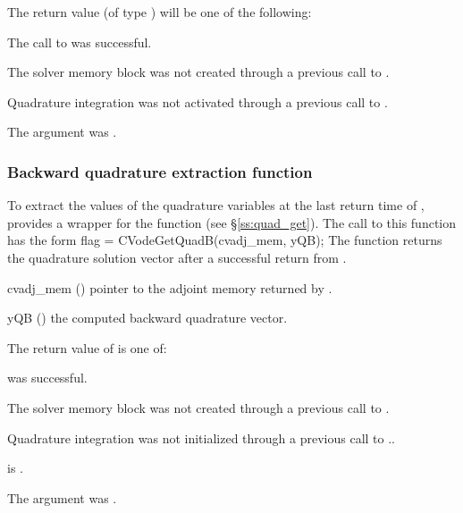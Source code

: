 {
  The return value  (of type ) will be one of the following:
  \begin{args}
  \item[\Id{CV\_SUCCESS}]
    The call to  was successful.
  \item[\Id{CV\_MEM\_NULL}] 
    The {\cvodes} solver memory block was not created through a 
    previous call to .
  \item[\Id{CV\_NO\_QUAD}] 
    Quadrature integration was not activated through a 
    previous call to .
  \item[\Id{CV\_ADJMEM\_NULL}]
    The  argument was .
  \end{args}
}
{}

\subsubsection{Backward quadrature extraction function}

To extract the values of the quadrature variables at the last return time
of , {\cvodes} provides a wrapper for the function 
(see \S\ref{ss:quad_get}). The call to this function has the form
{
  flag = CVodeGetQuadB(cvadj\_mem, yQB);
}
{
  The function  returns the quadrature solution vector after
  a successful return from .
}
{
  \begin{args}
  \item[cvadj\_mem] ()
    pointer to the adjoint memory returned by .
  \item[yQB] ()
    the computed backward quadrature vector.
  \end{args}
}
{
  The return value  of  is one of:
  \begin{args}
  \item[\Id{CV\_SUCCESS}] 
     was successful.
  \item[\Id{CV\_MEM\_NULL}] 
    The {\cvodes} solver memory block was not created through a 
    previous call to .
  \item[\Id{CV\_NO\_QUAD}] 
    Quadrature integration was not initialized through a 
    previous call to ..
  \item[\Id{Cv\_BAD\_DKY}] 
     is .
  \item[\Id{CV\_ADJMEM\_NULL}]
    The  argument was .
  \end{args}
}
{}

